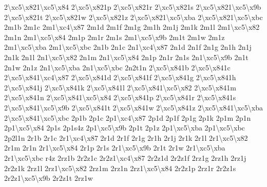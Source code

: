 {2\textbackslash{}xc5\textbackslash{}x821\textbackslash{}xc5\textbackslash{}x84 2\textbackslash{}xc5\textbackslash{}x821p 2\textbackslash{}xc5\textbackslash{}x821r 2\textbackslash{}xc5\textbackslash{}x821s 2\textbackslash{}xc5\textbackslash{}x821\textbackslash{}xc5\textbackslash{}x9b 2\textbackslash{}xc5\textbackslash{}x821t 2\textbackslash{}xc5\textbackslash{}x821w 2\textbackslash{}xc5\textbackslash{}x821z 2\textbackslash{}xc5\textbackslash{}x821\textbackslash{}xc5\textbackslash{}xba 2\textbackslash{}xc5\textbackslash{}x821\textbackslash{}xc5\textbackslash{}xbc 2m1b 2m1c 2m1\textbackslash{}xc4\textbackslash{}x87 2m1d 2m1f 2m1g 2m1h 2m1j 2m1k 2m1l 2m1\textbackslash{}xc5\textbackslash{}x82 2m1n 2m1\textbackslash{}xc5\textbackslash{}x84 2m1p 2m1r 2m1s 2m1\textbackslash{}xc5\textbackslash{}x9b 2m1t 2m1w 2m1z 2m1\textbackslash{}xc5\textbackslash{}xba 2m1\textbackslash{}xc5\textbackslash{}xbc 2n1b 2n1c 2n1\textbackslash{}xc4\textbackslash{}x87 2n1d 2n1f 2n1g 2n1h 2n1j 2n1k 2n1l 2n1\textbackslash{}xc5\textbackslash{}x82 2n1m 2n1\textbackslash{}xc5\textbackslash{}x84 2n1p 2n1r 2n1s 2n1\textbackslash{}xc5\textbackslash{}x9b 2n1t 2n1w 2n1z 2n1\textbackslash{}xc5\textbackslash{}xba 2n1\textbackslash{}xc5\textbackslash{}xbc 2n2t1n 2\textbackslash{}xc5\textbackslash{}x841b 2\textbackslash{}xc5\textbackslash{}x841c 2\textbackslash{}xc5\textbackslash{}x841\textbackslash{}xc4\textbackslash{}x87 2\textbackslash{}xc5\textbackslash{}x841d 2\textbackslash{}xc5\textbackslash{}x841f 2\textbackslash{}xc5\textbackslash{}x841g 2\textbackslash{}xc5\textbackslash{}x841h 2\textbackslash{}xc5\textbackslash{}x841j 2\textbackslash{}xc5\textbackslash{}x841k 2\textbackslash{}xc5\textbackslash{}x841l 2\textbackslash{}xc5\textbackslash{}x841\textbackslash{}xc5\textbackslash{}x82 2\textbackslash{}xc5\textbackslash{}x841m 2\textbackslash{}xc5\textbackslash{}x841n 2\textbackslash{}xc5\textbackslash{}x841\textbackslash{}xc5\textbackslash{}x84 2\textbackslash{}xc5\textbackslash{}x841p 2\textbackslash{}xc5\textbackslash{}x841r 2\textbackslash{}xc5\textbackslash{}x841s 2\textbackslash{}xc5\textbackslash{}x841\textbackslash{}xc5\textbackslash{}x9b 2\textbackslash{}xc5\textbackslash{}x841t 2\textbackslash{}xc5\textbackslash{}x841w 2\textbackslash{}xc5\textbackslash{}x841z 2\textbackslash{}xc5\textbackslash{}x841\textbackslash{}xc5\textbackslash{}xba 2\textbackslash{}xc5\textbackslash{}x841\textbackslash{}xc5\textbackslash{}xbc 2p1b 2p1c 2p1\textbackslash{}xc4\textbackslash{}x87 2p1d 2p1f 2p1g 2p1k 2p1m 2p1n 2p1\textbackslash{}xc5\textbackslash{}x84 2p1s 2p1s4z 2p1\textbackslash{}xc5\textbackslash{}x9b 2p1t 2p1z 2p1\textbackslash{}xc5\textbackslash{}xba 2p1\textbackslash{}xc5\textbackslash{}xbc 2p2l1n 2r1b 2r1c 2r1\textbackslash{}xc4\textbackslash{}x87 2r1d 2r1f 2r1g 2r1h 2r1j 2r1k 2r1l 2r1\textbackslash{}xc5\textbackslash{}x82 2r1m 2r1n 2r1\textbackslash{}xc5\textbackslash{}x84 2r1p 2r1s 2r1\textbackslash{}xc5\textbackslash{}x9b 2r1t 2r1w 2r1\textbackslash{}xc5\textbackslash{}xba 2r1\textbackslash{}xc5\textbackslash{}xbc r4z 2rz1b 2r2z1c 2r2z1\textbackslash{}xc4\textbackslash{}x87 2r2z1d 2r2z1f 2rz1g 2rz1h 2rz1j 2r2z1k 2rz1l 2rz1\textbackslash{}xc5\textbackslash{}x82 2rz1m 2rz1n 2rz1\textbackslash{}xc5\textbackslash{}x84 2r2z1p 2rz1r 2r2z1s 2r2z1\textbackslash{}xc5\textbackslash{}x9b 2r2z1t 2rz1w }
